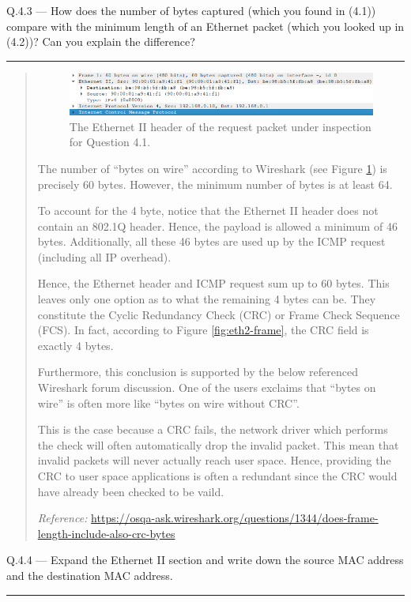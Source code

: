 \documentclass{article}
\newcommand\Que[2]{%
\begin{samepage}
\leavevmode\par
\noindent
Q.#1 --- #2\par\vspace{10pt}\hrule\vspace{10pt}
\end{samepage}}
\newenvironment{ans}
{\fbox{Answer}\begin{quote}\nopagebreak}
{\end{quote}}
\newcommand\Refer[1]{
\begin{center}
{\small\textit{Reference:} \url{#1}}
\end{center}
}%
\begin{document}
\Que{4.3}{How does the number of bytes captured (which you found
in (4.1)) compare with the minimum length of an Ethernet packet
(which you looked up in (4.2))? Can you explain the difference?}

\begin{ans}
\begin{figure}[H]
\centering
\includegraphics[width=14cm]{data/q4.3-ethernet-header.png}
\caption{The Ethernet II header of the request packet under
inspection for Question 4.1.}
\label{fig:eth2-header-for-q4.3}
\end{figure}

The number of ``bytes on wire'' according to Wireshark (see
Figure \ref{fig:eth2-header-for-q4.3}) is precisely 60 bytes.
However, the minimum number of bytes is at least 64.

To account for the 4 byte, notice that the Ethernet II header
does not contain an 802.1Q header. Hence, the payload is allowed
a minimum of 46 bytes. Additionally, all these 46 bytes are used
up by the ICMP request (including all IP overhead).

Hence, the Ethernet header and ICMP request sum up to 60 bytes.
This leaves only one option as to what the remaining 4 bytes can
be. They constitute the Cyclic Redundancy Check (CRC) or Frame
Check Sequence (FCS). In fact, according to Figure
\ref{fig:eth2-frame}, the CRC field is exactly 4 bytes.

Furthermore, this conclusion is supported by the
below referenced Wireshark forum discussion. One of the
users exclaims that ``bytes on wire'' is often more like
``bytes on wire without CRC''.

This is the case because a CRC fails, the network driver which
performs the check will often automatically drop the invalid
packet. This mean that invalid packets will never actually reach
user space. Hence, providing the CRC to user space applications
is often a redundant since the CRC would have already been
checked to be vaild.

\Refer{https://osqa-ask.wireshark.org/questions/1344/does-frame-length-include-also-crc-bytes}
\end{ans}

\Que{4.4}{Expand the Ethernet II section and write down the
source MAC address and the destination MAC address.}
\end{document}
